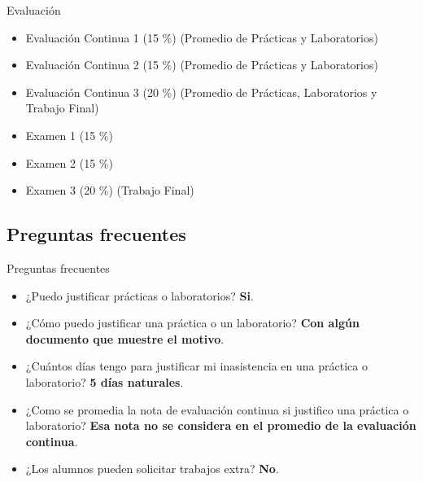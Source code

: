 \documentclass[10pt]{beamer}
\newcommand{\1}{
        	\setbeamertemplate{background}{
        		\texttt{[image: img/1]}
        		\tikz[overlay] \fill[fill opacity=0.75,fill=white] (0,0) rectangle (-\paperwidth,\paperheight);
        	}
}
\begin{document}
\begin{frame}{Evaluación}{}	
	\begin{itemize}
		\item Evaluación Continua 1 (15 \%) (Promedio de Prácticas y Laboratorios)
		\item Evaluación Continua 2 (15 \%) (Promedio de Prácticas y Laboratorios)
		\item Evaluación Continua 3 (20 \%) (Promedio de Prácticas, Laboratorios y Trabajo Final)
		\item Examen 1 (15 \%)
		\item Examen 2 (15 \%)
		\item Examen 3 (20 \%) (Trabajo Final)
	\end{itemize}
\end{frame}

\subsection{Preguntas frecuentes}

\begin{frame}{Preguntas frecuentes}{}	
	\begin{itemize}
		\item<1-> ¿Puedo justificar prácticas o laboratorios? \textbf{Si}.
		\item<2-> ¿Cómo puedo justificar una práctica o un laboratorio? \textbf{Con
		algún documento que muestre el motivo}.
		\item<3-> ¿Cuántos días tengo para justificar mi inasistencia en una
		práctica o laboratorio? \textbf{5 días naturales}.
		\item<4->¿Como se promedia la nota de evaluación continua si justifico
		una práctica o laboratorio? \textbf{Esa nota no se considera en el
		promedio de la evaluación continua}.
		\item<5->¿Los alumnos pueden solicitar trabajos extra? \textbf{No}.
	\end{itemize}
\end{frame}
\end{document}
